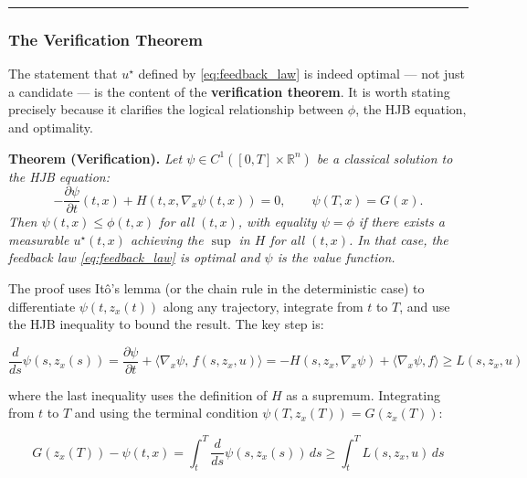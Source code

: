 \documentclass{article}
\begin{document}
\medskip\hrule\medskip

\subsubsection{The Verification Theorem}

\begin{mathrequirementsbox}
The statement that $u^\star$ defined by \eqref{eq:feedback_law} is indeed optimal
--- not just a candidate --- is the content of the \textbf{verification theorem}.
It is worth stating precisely because it clarifies the logical relationship
between $\phi$, the HJB equation, and optimality.

\medskip

\noindent\textbf{Theorem (Verification).} \label{thm:verification} \textit{Let $\psi \in C^1([0,T] \times
\mathbb{R}^n)$ be a classical solution to the HJB equation:}
\begin{equation}
    -\frac{\partial \psi}{\partial t}(t,x)
    + H(t, x, \nabla_x \psi(t,x)) = 0,
    \qquad \psi(T,x) = G(x).
\end{equation}
\textit{Then $\psi(t,x) \leq \phi(t,x)$ for all $(t,x)$, with equality
$\psi = \phi$ if there exists a measurable $u^\star(t,x)$ achieving the
$\sup$ in $H$ for all $(t,x)$. In that case, the feedback law
\eqref{eq:feedback_law} is optimal and $\psi$ is the value function.}

\medskip

The proof uses It\^{o}'s lemma (or the chain rule in the deterministic case)
to differentiate $\psi(t, z_x(t))$ along any trajectory, integrate from $t$
to $T$, and use the HJB inequality to bound the result. The key step is:

\begin{equation}
    \frac{d}{ds}\psi(s, z_x(s))
    = \frac{\partial \psi}{\partial t}
    + \langle \nabla_x \psi,\, f(s, z_x, u) \rangle
    = -H(s, z_x, \nabla_x\psi)
    + \langle \nabla_x\psi, f \rangle
    \geq L(s, z_x, u)
\end{equation}

where the last inequality uses the definition of $H$ as a supremum. Integrating
from $t$ to $T$ and using the terminal condition $\psi(T, z_x(T)) = G(z_x(T))$:

\begin{equation}
    G(z_x(T)) - \psi(t,x)
    = \int_t^T \frac{d}{ds}\psi(s, z_x(s))\, ds
    \geq \int_t^T L(s, z_x, u)\, ds
\end{equation}


\end{mathrequirementsbox}
\end{document}
